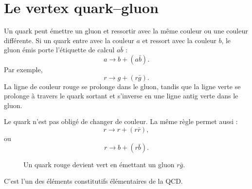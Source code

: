 \section{Le vertex quark--gluon}

Un quark peut émettre un gluon et ressortir avec la même couleur ou une couleur différente. Si un quark entre avec la couleur \(a\) et ressort avec la couleur \(b\), le gluon émis porte l’étiquette de calcul \(a\bar b\) :
\begin{equation}
a\longrightarrow b+(a\bar b).
\end{equation}
Par exemple,
\begin{equation}
r\longrightarrow g+(r\bar g).
\end{equation}
La ligne de couleur rouge se prolonge dans le gluon, tandis que la ligne verte se prolonge à travers le quark sortant et s’inverse en une ligne antig verte dans le gluon.

Le quark n’est pas obligé de changer de couleur. La même règle permet aussi :
\begin{equation}
r\longrightarrow r+(r\bar r),
\end{equation}
ou
\begin{equation}
r\longrightarrow b+(r\bar b).
\end{equation}

\begin{figure}[h]
\centering
{}
\caption{Un quark rouge devient vert en émettant un gluon \(r\bar g\).}
\end{figure}

C’est l’un des éléments constitutifs élémentaires de la QCD.

\begin{classroomqa}
\end{classroomqa}

